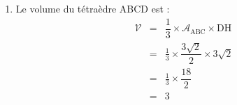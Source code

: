 \begin{enumerate}
\begin{enumerate}
\item Sachant que $\cos^2(\widehat{\text{BAC}}) + \sin^2(\widehat{\text{BAC}}) = 1$ :
\[
\begin{array}{rcl}
\sin^2(\widehat{\text{BAC}}) &=& 1 - \left(-\frac{3}{\sqrt{11}}\right)^2 \\
&=& 1 - \frac{9}{11} = \dfrac{2}{11}
\end{array}
\]
L'angle $\widehat{\text{BAC}}$ étant dans $[0~;~\pi]$, son sinus est positif : $\sin(\widehat{\text{BAC}}) = \dfrac{\sqrt{2}}{\sqrt{11}}$.

\item L'aire du triangle ABC est donnée par :
\[
\begin{array}{rcl}
\mathcal{A} &=& \frac{1}{2} \times \text{AB} \times \text{AC} \times \sin(\widehat{\text{BAC}}) \\
&=& \frac{1}{2} \times 3 \times \sqrt{11} \times \dfrac{\sqrt{2}}{\sqrt{11}} \\
&=& \dfrac{3\sqrt{2}}{2}
\end{array}
\]
\end{enumerate}

\item Le volume du tétraèdre ABCD est :
\[
\begin{array}{rcl}
\mathcal{V} &=& \dfrac{1}{3} \times \mathcal{A}_{\text{ABC}} \times \text{DH} \\
&=& \frac{1}{3} \times \dfrac{3\sqrt{2}}{2} \times 3\sqrt{2} \\
&=& \frac{1}{3} \times \dfrac{18}{2} \\
&=& 3
\end{array}
\]
\end{enumerate}
